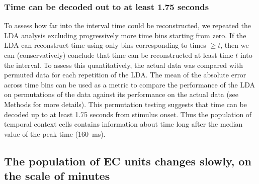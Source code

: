 \documentclass{apa}
\begin{document}
\subsubsection{Time can be decoded out to at least 1.75 seconds}
To assess how far into the interval time could be reconstructed, we repeated
the LDA analysis excluding progressively more time bins starting from zero.
If the LDA can reconstruct time using only bins corresponding to times $\geq
t$, then we can (conservatively) conclude that time can be reconstructed at
least time $t$ into the interval. To assess this quantitatively,
the actual data was compared with permuted data for each repetition of the LDA.  
The mean of
the absolute error across time bins can be used as a metric to compare the
performance of the LDA on permutations of the data against its performance on
the actual data (see Methods for more details). This permutation testing suggests that time can be decoded up to at least 1.75
seconds from stimulus onset.  Thus the population of temporal context cells
contains information about time long after the median value of
the peak time (160~ms).




\subsection{The population of EC units changes slowly, on the scale of
minutes}
\end{document}
